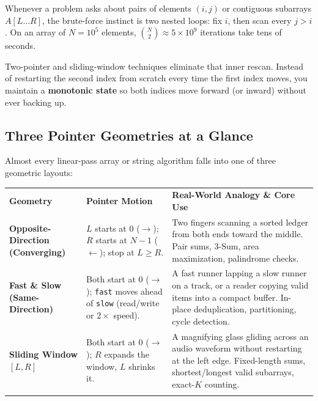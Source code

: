 \documentclass[11pt,a4paper]{article}
\theoremstyle{definition}
\begin{document}
Whenever a problem asks about pairs of elements $(i, j)$ or contiguous subarrays $A[L \dots R]$, the brute-force instinct is two nested loops: fix $i$, then scan every $j > i$. On an array of $N = 10^5$ elements, $\binom{N}{2} \approx 5 \times 10^9$ iterations take tens of seconds.

Two-pointer and sliding-window techniques eliminate that inner rescan. Instead of restarting the second index from scratch every time the first index moves, you maintain a \textbf{monotonic state} so both indices move forward (or inward) without ever backing up.

\subsection{Three Pointer Geometries at a Glance}

Almost every linear-pass array or string algorithm falls into one of three geometric layouts:

\begingroup\small{}
\begin{tabularx}{\textwidth}{>{\raggedright\arraybackslash\bfseries}p{3.6cm} >{\raggedright\arraybackslash}p{3.5cm} >{\raggedright\arraybackslash}X}
\arrayrulecolor{primaryblue}\toprule[1.2pt]
\rowcolor{primaryblue!10}
\textcolor{primaryblue}{\textbf{Geometry}} & \textcolor{primaryblue}{\textbf{Pointer Motion}} & \textcolor{primaryblue}{\textbf{Real-World Analogy \& Core Use}} \\
\arrayrulecolor{codeframe}\midrule[0.6pt]
Opposite-Direction (Converging) & $L$ starts at $0$ ($\to$); $R$ starts at $N-1$ ($\leftarrow$); stop at $L \ge R$. & Two fingers scanning a sorted ledger from both ends toward the middle. Pair sums, 3-Sum, area maximization, palindrome checks. \\
Fast \& Slow (Same-Direction) & Both start at $0$ ($\to$); \texttt{fast} moves ahead of \texttt{slow} (read/write or $2\times$ speed). & A fast runner lapping a slow runner on a track, or a reader copying valid items into a compact buffer. In-place deduplication, partitioning, cycle detection. \\
Sliding Window $[L, R]$ & Both start at $0$ ($\to$); $R$ expands the window, $L$ shrinks it. & A magnifying glass gliding across an audio waveform without restarting at the left edge. Fixed-length sums, shortest/longest valid subarrays, exact-$K$ counting. \\
\arrayrulecolor{primaryblue}\bottomrule[1.2pt]
\end{tabularx}\endgroup
\end{document}
